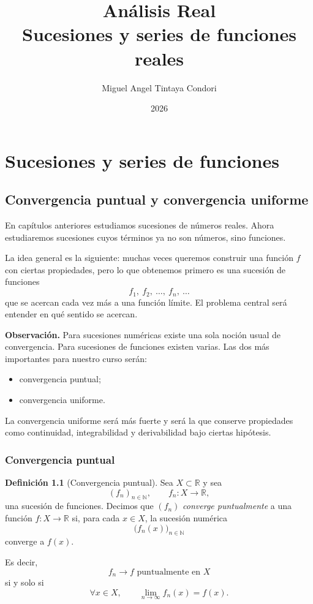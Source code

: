 \documentclass[11pt,a4paper,openany]{book}
\title{Análisis Real\\\large Sucesiones y series de funciones reales}
\author{Miguel Angel Tintaya Condori}
\date{2026}
\theoremstyle{definition}
\newtheorem{definicion}{Definición}[chapter]
\theoremstyle{plain}
\theoremstyle{remark}
\newenvironment{observacion}
{\par\medskip\noindent\textbf{Observación. }\normalfont}
{\par\medskip}
\newcommand{\R}{\mathbb{R}}
\newcommand{\N}{\mathbb{N}}
\begin{document}
\maketitle
\tableofcontents
\chapter{Sucesiones y series de funciones}

\section{Convergencia puntual y convergencia uniforme}

En capítulos anteriores estudiamos sucesiones de números reales. Ahora
estudiaremos sucesiones cuyos términos ya no son números, sino funciones.

La idea general es la siguiente: muchas veces queremos construir una función
$f$ con ciertas propiedades, pero lo que obtenemos primero es una sucesión de
funciones
\[
    f_1,\ f_2,\ \ldots,\ f_n,\ \ldots
\]
que se acercan cada vez más a una función límite. El problema central será
entender en qué sentido se acercan.

\begin{observacion}
Para sucesiones numéricas existe una sola noción usual de convergencia.
Para sucesiones de funciones existen varias. Las dos más importantes para
nuestro curso serán:

\begin{itemize}
    \item convergencia puntual;
    \item convergencia uniforme.
\end{itemize}

La convergencia uniforme será más fuerte y será la que conserve propiedades
como continuidad, integrabilidad y derivabilidad bajo ciertas hipótesis.
\end{observacion}

\subsection{Convergencia puntual}

\begin{grisplano}
\begin{definicion}[Convergencia puntual]
Sea $X\subset \R$ y sea
\[
    (f_n)_{n\in\N},\qquad f_n:X\to\R,
\]
una sucesión de funciones. Decimos que $(f_n)$ \emph{converge puntualmente}
a una función $f:X\to\R$ si, para cada $x\in X$, la sucesión numérica
\[
    \bigl(f_n(x)\bigr)_{n\in\N}
\]
converge a $f(x)$.

Es decir,
\[
    f_n\to f \text{ puntualmente en }X
\]
si y solo si
\[
    \forall x\in X,\qquad
    \lim_{n\to\infty} f_n(x)=f(x).
\]
\end{definicion}
\end{grisplano}
\end{document}
